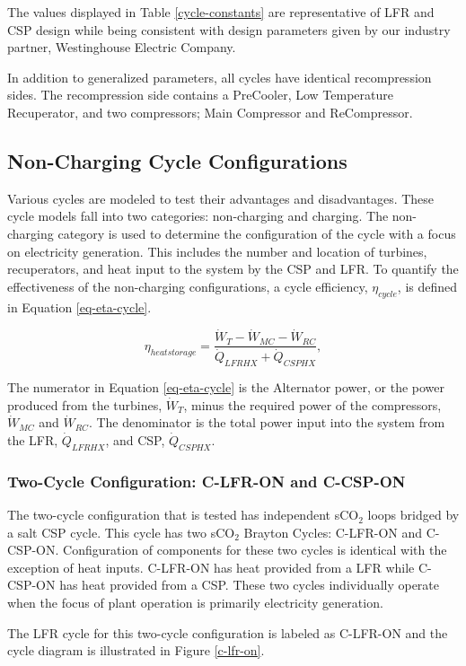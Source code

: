 \begin{paracol}{2}
The values displayed in Table \ref{cycle-constants} are representative of LFR and CSP design while being consistent with design parameters given by our industry partner, Westinghouse Electric Company. 

In addition to generalized parameters, all cycles have identical recompression sides. The recompression side contains a PreCooler, Low Temperature Recuperator, and two compressors; Main Compressor and ReCompressor.

\subsection{Non-Charging Cycle Configurations}%
Various cycles are modeled to test their advantages and disadvantages. These cycle models fall into two categories: non-charging and charging. The non-charging category is used to determine the configuration of the cycle with a focus on electricity generation. This includes the number and location of turbines, recuperators, and heat input to the system by the CSP and LFR. To quantify the effectiveness of the non-charging configurations, a cycle efficiency, $\eta_{cycle}$, is defined in Equation \ref{eq-eta-cycle}.

\begin{equation}
    \label{eq-eta-cycle}
    \eta_{heatstorage} = \frac{\dot{W}_{T}-\dot{W}_{MC}-\dot{W}_{RC}}{\dot{Q}_{LFRHX}+\dot{Q}_{CSPHX}},
\end{equation}

The numerator in Equation \ref{eq-eta-cycle} is the Alternator power, or the power produced from the turbines, $\dot{W}_{T}$, minus the required power of the compressors, $\dot{W}_{MC}$ and $\dot{W}_{RC}$. The denominator is the total power input into the system from the LFR, $\dot{Q}_{LFRHX}$, and CSP, $\dot{Q}_{CSPHX}$.


\subsubsection{Two-Cycle Configuration: C-LFR-ON and C-CSP-ON} %

The two-cycle configuration that is tested has independent sCO$_{2}$ loops bridged by a salt CSP cycle. This cycle has two sCO$_{2}$ Brayton Cycles: C-LFR-ON and C-CSP-ON. Configuration of components for these two cycles is identical with the exception of heat inputs. C-LFR-ON has heat provided from a LFR while C-CSP-ON has heat provided from a CSP. These two cycles individually operate when the focus of plant operation is primarily electricity generation.

The LFR cycle for this two-cycle configuration is labeled as C-LFR-ON and the cycle diagram is illustrated in Figure \ref{c-lfr-on}.

\end{paracol}

